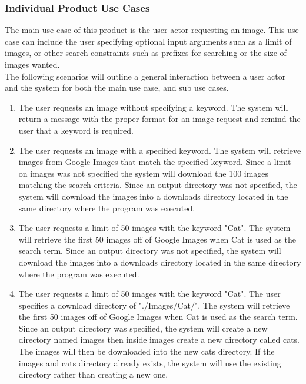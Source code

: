 \documentclass[12pt, titlepage]{article}
\begin{document}
\subsubsection{Individual Product Use Cases}

The main use case of this product is the user actor requesting an image. This use case can include the user specifying optional input arguments such as a limit of images, or other search constraints such as prefixes for searching or the size of images wanted.\\

\noindent The following scenarios will outline a general interaction between a user actor and the system for both the main use case, and sub use cases. 

\begin{enumerate}[label=Scenario \arabic*:, wide=0pt, leftmargin=*]
    \item The user requests an image without specifying a keyword. The system will return a message with the proper format for an image request and remind the user that a keyword is required.
    
    \item The user requests an image with a specified keyword. The system will retrieve images from Google Images that match the specified keyword. Since a limit on images was not specified the system will download the 100 images matching the search criteria. Since an output directory was not specified, the system will download the images into a downloads directory located in the same directory where the program was executed.
    
    \item The user requests a limit of 50 images with the keyword "Cat". The system will retrieve the first 50 images off of Google Images when Cat is used as the search term. Since an output directory was not specified, the system will download the images into a downloads directory located in the same directory where the program was executed.
    
    \item The user requests a limit of 50 images with the keyword "Cat". The user specifies a download directory of "./Images/Cat/". The system will retrieve the first 50 images off of Google Images when Cat is used as the search term. Since an output directory was specified, the system will create a new directory named images then inside images create a new directory called cats. The images will then be downloaded into the new cats directory. If the images and cats directory already exists, the system will use the existing directory rather than creating a new one.
    

\end{enumerate}
\end{document}
